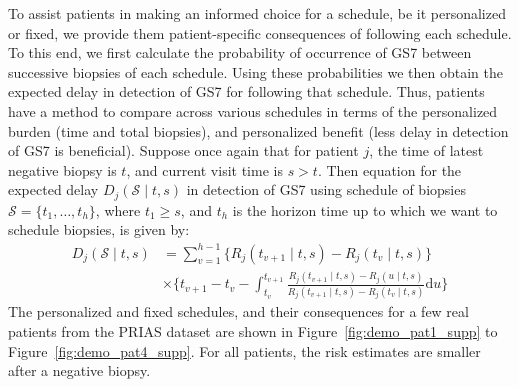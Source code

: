 To assist patients in making an informed choice for a schedule, be it personalized or fixed, we provide them patient-specific consequences of following each schedule. To this end, we first calculate the probability of occurrence of GS7 between successive biopsies of each schedule. Using these probabilities we then obtain the expected delay in detection of GS7 for following that schedule. Thus, patients have a method to compare across various schedules in terms of the personalized burden (time and total biopsies), and personalized benefit (less delay in detection of GS7 is beneficial). Suppose once again that for patient $j$, the time of latest negative biopsy is $t$, and current visit time is $s > t$. Then equation for the expected delay $D_j(\mathcal{S} \mid t,s)$ in detection of GS7 using schedule of biopsies $\mathcal{S} = \{t_1, \ldots, t_h\}$, where $t_1 \geq s$, and $t_h$ is the horizon time up to which we want to schedule biopsies, is given by:
\begin{equation}
\label{eq:expected_delay}
\begin{split}
D_j(\mathcal{S} \mid t,s) &= \sum_{v=1}^{h-1} \Big\{R_j(t_{v+1}\mid t,s) - R_j(t_v\mid t,s)\Big\} \\ & \times  \Bigg\{t_{v+1} - t_{v} - \int_{t_v}^{t_{v+1}} \frac{R_j(t_{v+1}\mid t,s)-R_j(u \mid t,s)}{R_j(t_{v+1}\mid t,s) - R_j(t_v\mid t,s)} \mathrm{d}u \Bigg\}
\end{split}
\end{equation}
The personalized and fixed schedules, and their consequences for a few real patients from the PRIAS dataset are shown in Figure~\ref{fig:demo_pat1_supp} to Figure~\ref{fig:demo_pat4_supp}. For all patients, the risk estimates are smaller after a negative biopsy.

